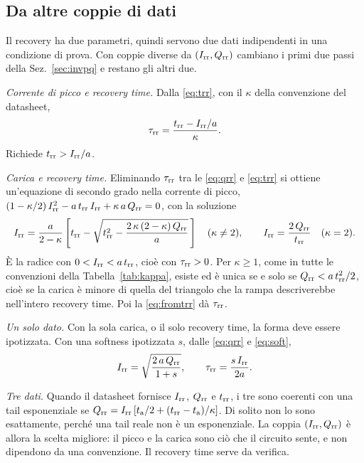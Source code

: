 \documentclass[10pt,a4paper]{scrartcl}
\let\newcommand\pdvaluedefine
\newcommand{\Irr}{I_\mathrm{rr}}
\newcommand{\Qrr}{Q_\mathrm{rr}}
\newcommand{\trr}{t_\mathrm{rr}}
\newcommand{\ta}{t_\mathrm{a}}
\newcommand{\taurr}{\tau_\mathrm{rr}}
\begin{document}
\subsection{Da altre coppie di dati}
\label{sec:pairs}
Il recovery ha due parametri, quindi servono due dati indipendenti in una condizione di prova. Con coppie diverse da $(\Irr, \Qrr)$ cambiano i primi due passi della Sez.~\ref{sec:invpq} e restano gli altri due.

\emph{Corrente di picco e recovery time.} Dalla \eqref{eq:trr}, con il $\kappa$ della convenzione del datasheet,
\begin{equation}
\taurr = \frac{\trr - \Irr/a}{\kappa} .
\label{eq:fromtrr}
\end{equation}
Richiede $\trr > \Irr/a$.

\emph{Carica e recovery time.} Eliminando $\taurr$ tra le \eqref{eq:qrr} e \eqref{eq:trr} si ottiene un'equazione di secondo grado nella corrente di picco, $(1-\kappa/2)\,\Irr^2 - a\,\trr\,\Irr + \kappa\,a\,\Qrr = 0$, con la soluzione
\begin{equation}
\Irr = \frac{a}{2-\kappa}\left[\trr - \sqrt{\trr^2 - \frac{2\,\kappa\,(2-\kappa)\,\Qrr}{a}}\,\right] \quad (\kappa \neq 2) , \qquad \Irr = \frac{2\,\Qrr}{\trr} \quad (\kappa = 2) .
\label{eq:fromqt}
\end{equation}
È la radice con $0 < \Irr < a\,\trr$, cioè con $\taurr > 0$. Per $\kappa \geq 1$, come in tutte le convenzioni della Tabella~\ref{tab:kappa}, esiste ed è unica se e solo se $\Qrr < a\,\trr^2/2$, cioè se la carica è minore di quella del triangolo che la rampa descriverebbe nell'intero recovery time. Poi la \eqref{eq:fromtrr} dà $\taurr$.

\emph{Un solo dato.} Con la sola carica, o il solo recovery time, la forma deve essere ipotizzata. Con una softness ipotizzata $s$, dalle \eqref{eq:qrr} e \eqref{eq:soft},
\begin{equation}
\Irr = \sqrt{\frac{2\,a\,\Qrr}{1+s}} , \qquad \taurr = \frac{s\,\Irr}{2a} .
\label{eq:fromq}
\end{equation}

\emph{Tre dati.} Quando il datasheet fornisce $\Irr$, $\Qrr$ e $\trr$, i tre sono coerenti con una tail esponenziale se $\Qrr = \Irr\,[\ta/2 + (\trr-\ta)/\kappa]$. Di solito non lo sono esattamente, perché una tail reale non è un esponenziale. La coppia $(\Irr, \Qrr)$ è allora la scelta migliore: il picco e la carica sono ciò che il circuito sente, e non dipendono da una convenzione. Il recovery time serve da verifica.
\end{document}
